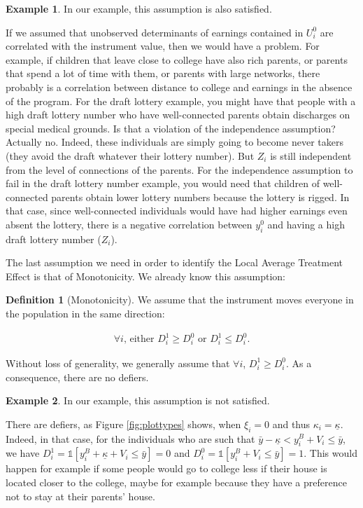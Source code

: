 \documentclass[
]{book}
\newcommand{\uns}[1]{\mathds{1}[ #1 ]}
\theoremstyle{definition}
\newtheorem{definition}{Definition}[chapter]
\theoremstyle{definition}
\newtheorem{example}{Example}[chapter]
\theoremstyle{definition}
\theoremstyle{definition}
\theoremstyle{remark}
\begin{document}
\begin{example}
\protect\hypertarget{exm:unnamed-chunk-143}{}{\label{exm:unnamed-chunk-143} }In our example, this assumption is also satisfied.
\end{example}
If we assumed that unobserved determinants of earnings contained in \(U^0_i\) are correlated with the instrument value, then we would have a problem.
For example, if children that leave close to college have also rich parents, or parents that spend a lot of time with them, or parents with large networks, there probably is a correlation between distance to college and earnings in the absence of the program.
For the draft lottery example, you might have that people with a high draft lottery number who have well-connected parents obtain discharges on special medical grounds.
Is that a violation of the independence assumption?
Actually no.
Indeed, these individuals are simply going to become never takers (they avoid the draft whatever their lottery number).
But \(Z_i\) is still independent from the level of connections of the parents.
For the independence assumption to fail in the draft lottery number example, you would need that children of well-connected parents obtain lower lottery numbers because the lottery is rigged.
In that case, since well-connected individuals would have had higher earnings even absent the lottery, there is a negative correlation between \(y_i^0\) and having a high draft lottery number (\(Z_i\)).

The last assumption we need in order to identify the Local Average Treatment Effect is that of Monotonicity.
We already know this assumption:

\begin{definition}[Monotonicity]
\protect\hypertarget{def:Monotonicity}{}{\label{def:Monotonicity} \iffalse (Monotonicity) \fi{} }We assume that the instrument moves everyone in the population in the same direction:

\begin{align*}
\forall i\text{, either } D^1_i\geq D_i^0 \text{ or } D^1_i\leq D_i^0.
\end{align*}
\end{definition}

Without loss of generality, we generally assume that \(\forall i\), \(D^1_i\geq D_i^0\).
As a consequence, there are no defiers.

\begin{example}
\protect\hypertarget{exm:unnamed-chunk-144}{}{\label{exm:unnamed-chunk-144} }In our example, this assumption is not satisfied.
\end{example}
There are defiers, as Figure \ref{fig:plottypes} shows, when \(\xi_i = 0\) and thus \(\kappa_i=\underline{\kappa}\).
Indeed, in that case, for the individuals who are such that \(\bar{y}-\underline{\kappa}<y_i^B+V_i\leq\bar{y}\), we have \(D^1_i=\uns{y_i^B+\underline{\kappa} + V_i\leq\bar{y}}=0\) and \(D^0_i=\uns{y_i^B + V_i\leq\bar{y}}=1\).
This would happen for example if some people would go to college less if their house is located closer to the college, maybe for example because they have a preference not to stay at their parents' house.
\end{document}
